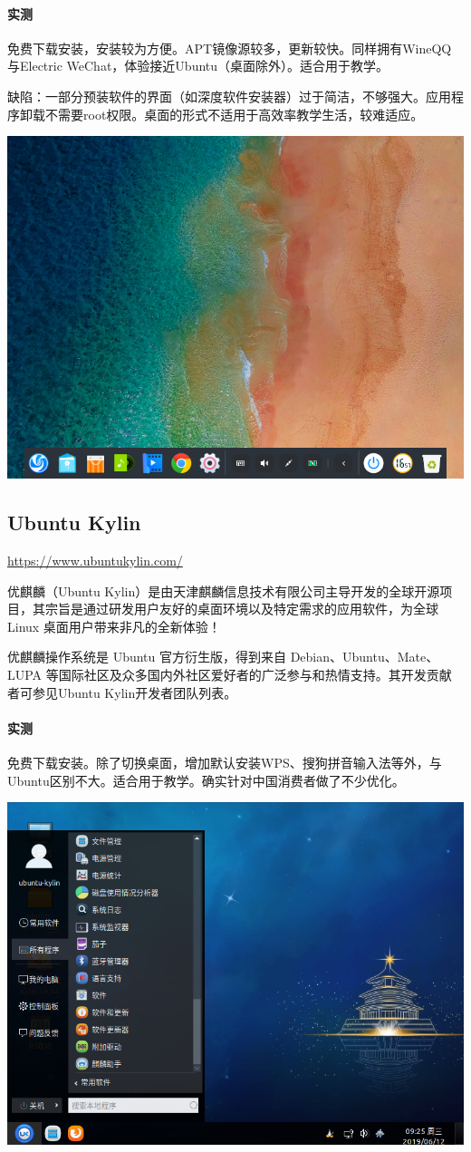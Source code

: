 \paragraph{实测}
免费下载安装，安装较为方便。APT镜像源较多，更新较快。同样拥有WineQQ与Electric WeChat，体验接近Ubuntu（桌面除外）。适合用于教学。\par
缺陷：一部分预装软件的界面（如深度软件安装器）过于简洁，不够强大。应用程序卸载不需要root权限。桌面的形式不适用于高效率教学生活，较难适应。
\begin{center}
	\includegraphics[width=0.7\linewidth]{pic/deepin}
\end{center}
\subsection{Ubuntu Kylin}
\url{https://www.ubuntukylin.com/}\par
优麒麟（Ubuntu Kylin）是由天津麒麟信息技术有限公司主导开发的全球开源项目，其宗旨是通过研发用户友好的桌面环境以及特定需求的应用软件，为全球 Linux 桌面用户带来非凡的全新体验！\par
优麒麟操作系统是 Ubuntu 官方衍生版，得到来自 Debian、Ubuntu、Mate、LUPA 等国际社区及众多国内外社区爱好者的广泛参与和热情支持。其开发贡献者可参见Ubuntu Kylin开发者团队列表。\cite{ukinfo}
\paragraph{实测}
免费下载安装。除了切换桌面，增加默认安装WPS、搜狗拼音输入法等外，与Ubuntu区别不大。适合用于教学。确实针对中国消费者做了不少优化。
\begin{center}
	\includegraphics[width=0.7\linewidth]{pic/uk}
\end{center} \par
